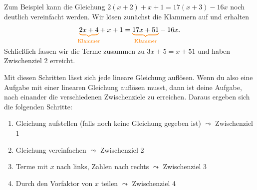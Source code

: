 \documentclass[../../main.tex]{subfiles}
\begin{document}
{Zum Beispiel kann die Gleichung $2(x+2)+x+1=17(x+3)-16x$ noch deutlich vereinfacht werden. Wir lösen zunächst die Klammern auf und erhalten
\[\colorbrace{2x+4}{\text{Klammer}}+x+1=\colorbrace{17x+51}{\text{Klammer}}-16x.\]
Schließlich fassen wir die Terme zusammen zu $3x+5=x+51$ und haben Zwischenziel 2 erreicht.

Mit diesen Schritten lässt sich jede lineare Gleichung auflösen. Wenn du also eine Aufgabe mit einer linearen Gleichung auflösen musst, dann ist deine Aufgabe, nach einander die verschiedenen Zwischenziele zu erreichen. Daraus ergeben sich die folgenden Schritte:
\begin{enumerate}
    \item Gleichung aufstellen (falls noch keine Gleichung gegeben ist) \hfill \textcolor{black!40}{$\leadsto$ Zwischenziel 1}
    \item Gleichung vereinfachen \hfill \textcolor{black!40}{$\leadsto$ Zwischenziel 2}
    \item Terme mit $x$ nach links, Zahlen nach rechts \hfill \textcolor{black!40}{$\leadsto$ Zwischenziel 3}
    \item Durch den Vorfaktor von $x$ teilen \hfill \textcolor{black!40}{$\leadsto$ Zwischenziel 4}
\end{enumerate}
}
\end{document}
